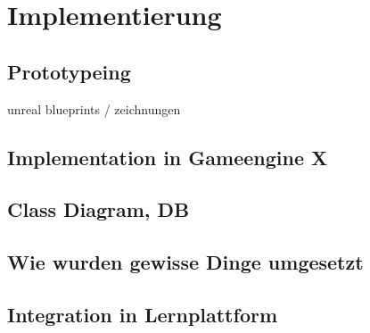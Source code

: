 \section{Implementierung}\label{sec:impl}
\subsection{Prototypeing}
	unreal blueprints / zeichnungen
\subsection{Implementation in Gameengine X}
\subsection{Class Diagram, DB}
\subsection{Wie wurden gewisse Dinge umgesetzt}
\subsection{Integration in Lernplattform}
